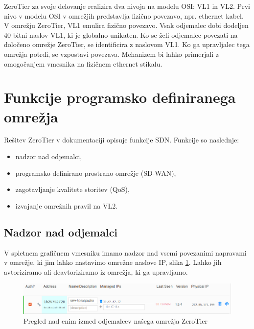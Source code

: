 \documentclass[a4paper, 12pt]{book}
\begin{document}
ZeroTier za svoje delovanje realizira dva nivoja na modelu OSI: VL1 in VL2. Prvi nivo v modelu OSI v omrežjih predstavlja fizično povezavo, npr. ethernet kabel. V omrežju ZeroTier, VL1 emulira fizično povezavo. Vsak odjemalec dobi dodeljen 40-bitni naslov VL1, ki je globalno unikaten. Ko se želi odjemalec povezati na določeno omrežje ZeroTier, se identificira z naslovom VL1. Ko ga upravljalec tega omrežja potrdi, se vzpostavi povezava. Mehanizem bi lahko primerjali z omogočanjem vmesnika na fizičnem ethernet stikalu.

\section{Funkcije programsko definiranega omrežja}
Rešitev ZeroTier v dokumentaciji opisuje funkcije SDN. Funkcije so naslednje:
\begin{itemize}
    \item nadzor nad odjemalci,
    \item programsko definirano prostrano omrežje (SD-WAN),
    \item zagotavljanje kvalitete storitev (QoS),
    \item izvajanje omrežnih pravil na VL2. 
\end{itemize}

\subsection{Nadzor nad odjemalci}
V spletnem grafičnem vmesniku imamo nadzor nad vsemi povezanimi napravami v omrežje, ki jim lahko nastavimo omrežne naslove IP, slika \ref{administering_ZeroTier}. Lahko jih avtoriziramo ali deavtoriziramo iz omrežja, ki ga upravljamo.

\begin{figure}[H]
\begin{center}
\includegraphics[width=1\textwidth]{fotografije/administering_ZeroTier.png}
\end{center}
\caption{Pregled nad enim izmed odjemalcev našega omrežja ZeroTier \cite{rvidmar}}
\label{administering_ZeroTier}
\end{figure}
\end{document}
